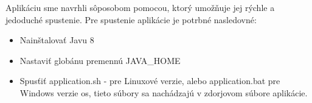 Aplikáciu sme navrhli sôposobom pomocou, ktorý umožňuje jej rýchle a jedoduché spustenie. Pre spustenie aplikácie je potrbné nasledovné: 
\begin{itemize}
	\item Nainštalovať Javu 8
	\item Nastaviť globánu premennú JAVA\_HOME
	\item Spusťiť application.sh - pre Linuxové verzie, alebo application.bat pre Windows verzie \acrshort{os}, tieto súbory sa nachádzajú v zdorjovom súbore aplikácie.
\end{itemize}